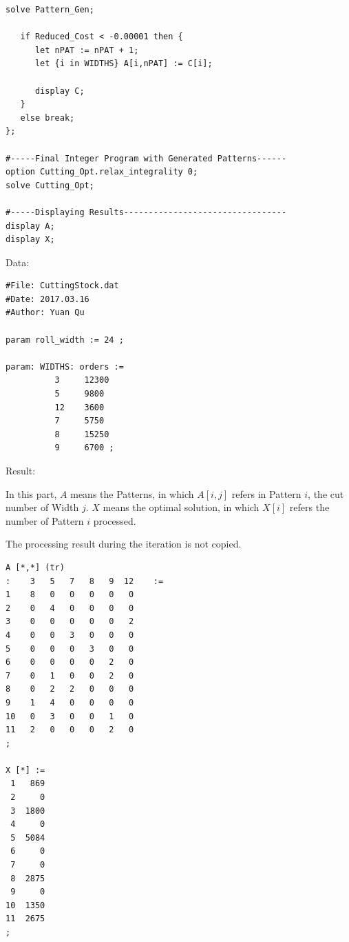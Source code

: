 \documentclass{article}
\begin{document}
{\begin{lstlisting}[language=AMPL]
   solve Pattern_Gen;

   if Reduced_Cost < -0.00001 then {
      let nPAT := nPAT + 1;
      let {i in WIDTHS} A[i,nPAT] := C[i];
      
      display C;
   }
   else break;
};

#-----Final Integer Program with Generated Patterns------
option Cutting_Opt.relax_integrality 0;
solve Cutting_Opt;

#-----Displaying Results---------------------------------
display A; 
display X;
    \end{lstlisting}

    Data:
    \begin{lstlisting}[language=AMPL]
#File: CuttingStock.dat
#Date: 2017.03.16
#Author: Yuan Qu

param roll_width := 24 ;

param: WIDTHS: orders :=
          3     12300
          5     9800
          12    3600
          7     5750
          8     15250
          9     6700 ;

    \end{lstlisting}

    Result:

    In this part, \(\mathit{A}\) means the Patterns, in which \(\mathit{A[i,j]}\) refers in Pattern \(\mathit{i}\), the cut number of Width \(\mathit{j}\). \(\mathit{X}\) means the optimal solution, in which \(\mathit{X[i]}\) refers the number of Pattern \(\mathit{i}\) processed.

    The processing result during the iteration is not copied.
    \begin{lstlisting}
A [*,*] (tr)
:    3   5   7   8   9  12    :=
1    8   0   0   0   0   0
2    0   4   0   0   0   0
3    0   0   0   0   0   2
4    0   0   3   0   0   0
5    0   0   0   3   0   0
6    0   0   0   0   2   0
7    0   1   0   0   2   0
8    0   2   2   0   0   0
9    1   4   0   0   0   0
10   0   3   0   0   1   0
11   2   0   0   0   2   0
;

X [*] :=
 1   869
 2     0
 3  1800
 4     0
 5  5084
 6     0
 7     0
 8  2875
 9     0
10  1350
11  2675
;
    \end{lstlisting}
}
\end{document}
